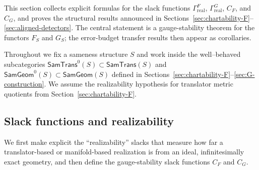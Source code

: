 \documentclass[11pt]{article}
\newcommand{\SamTrans}{\mathsf{SamTrans}}
\newcommand{\SamGeom}{\mathsf{SamGeom}}
\begin{document}
This section collects explicit formulas for the slack functions
$\Gamma_{\mathrm{real}}^{F}$, $\Gamma_{\mathrm{real}}^{G}$, $C_F$, and $C_G$,
and proves the structural results announced in Sections~\ref{sec:chartability-F}–\ref{sec:aligned-detectors}.
The central statement is a gauge-stability theorem for the functors
$F_S$ and $G_S$; the error-budget transfer results then appear as corollaries.

Throughout we fix a sameness structure $S$ and work inside the
well–behaved subcategories
$\SamTrans^0(S) \subset \SamTrans(S)$ and $\SamGeom^0(S) \subset \SamGeom(S)$
defined in Sections~\ref{sec:chartability-F}–\ref{sec:G-construction}.
We assume the realizability hypothesis for translator metric quotients
from Section~\ref{sec:chartability-F}.

\subsection{Slack functions and realizability}
\label{subsec:slack-functions}

We first make explicit the ``realizability'' slacks that measure how far a
translator-based or manifold-based realization is from an ideal,
infinitesimally exact geometry, and then define the gauge-stability
slack functions $C_F$ and $C_G$.
\end{document}
